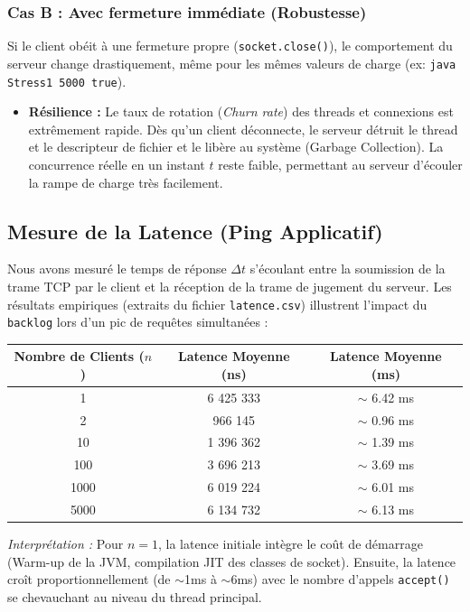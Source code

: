 \documentclass[11pt,a4paper]{article}
\begin{document}
\subsubsection{Cas B : Avec fermeture immédiate (Robustesse)}
Si le client obéit à une fermeture propre (\texttt{socket.close()}), le comportement du serveur change drastiquement, même pour les mêmes valeurs de charge (ex: \texttt{java Stress1 5000 true}).
\begin{itemize}
    \item \textbf{Résilience :} Le taux de rotation (\textit{Churn rate}) des threads et connexions est extrêmement rapide. Dès qu'un client déconnecte, le serveur détruit le thread et le descripteur de fichier et le libère au système (Garbage Collection). La concurrence réelle en un instant $t$ reste faible, permettant au serveur d'écouler la rampe de charge très facilement.
\end{itemize}

\subsection{Mesure de la Latence (Ping Applicatif)}

Nous avons mesuré le temps de réponse $\Delta t$ s'écoulant entre la soumission de la trame TCP par le client et la réception de la trame de jugement du serveur. Les résultats empiriques (extraits du fichier \texttt{latence.csv}) illustrent l'impact du \texttt{backlog} lors d'un pic de requêtes simultanées :

\begin{center}
\begin{tabular}{|c|c|c|}
\hline
\textbf{Nombre de Clients ($n$)} & \textbf{Latence Moyenne (ns)} & \textbf{Latence Moyenne (ms)} \\
\hline
1 & 6 425 333 & $\sim$ 6.42 ms \\
2 & 966 145 & $\sim$ 0.96 ms \\
10 & 1 396 362 & $\sim$ 1.39 ms \\
100 & 3 696 213 & $\sim$ 3.69 ms \\
1000 & 6 019 224 & $\sim$ 6.01 ms \\
5000 & 6 134 732 & $\sim$ 6.13 ms \\
\hline
\end{tabular}
\end{center}

\textit{Interprétation : } Pour $n=1$, la latence initiale intègre le coût de démarrage (Warm-up de la JVM, compilation JIT des classes de socket). Ensuite, la latence croît proportionnellement (de $\sim$1ms à $\sim$6ms) avec le nombre d'appels \texttt{accept()} se chevauchant au niveau du thread principal.
\end{document}
